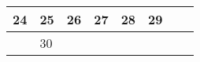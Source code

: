 {\begin{tabularx}{\linewidth}{|l!{\vrule width \myLenLineThicknessThick}*{7}{@{}X@{}|}}
      
      
        \begin{minipage}[t]{6mm}\centering{}24\end{minipage}
      
       & 
    
      
      
        \begin{minipage}[t]{6mm}\centering{}25\end{minipage}
      
       & 
    
      
      
        \begin{minipage}[t]{6mm}\centering{}26\end{minipage}
      
       & 
    
      
      
        \begin{minipage}[t]{6mm}\centering{}27\end{minipage}
      
       & 
    
      
      
        \begin{minipage}[t]{6mm}\centering{}28\end{minipage}
      
       & 
    
      
      
        \begin{minipage}[t]{6mm}\centering{}29\end{minipage}
      
      
        \\  \hline 
      
    
  
  
  
  \hyperlink{week-2026-48}{} &
    
      
      
        \begin{minipage}[t]{6mm}\centering{}30\end{minipage}
      
       & 
    
      
      
       & 
    
      
      
       & 
    
      
      
       & 
    
      
      
       & 
    
      
      
       & 
    
      
      
      
        \\  \hline 
      
    
  
  
  \end{tabularx}
}
